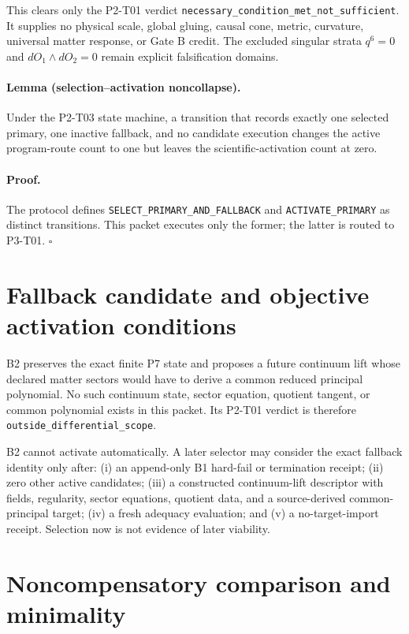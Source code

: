 \documentclass[11pt]{article}
\begin{document}
This clears only the P2-T01 verdict
\texttt{necessary\_condition\_met\_not\_sufficient}. It supplies no physical
scale, global gluing, causal cone, metric, curvature, universal matter response,
or Gate B credit. The excluded singular strata $q^6=0$ and
$dO_1\wedge dO_2=0$ remain explicit falsification domains.

\paragraph{Lemma (selection--activation noncollapse).}
Under the P2-T03 state machine, a transition that records exactly one selected
primary, one inactive fallback, and no candidate execution changes the active
program-route count to one but leaves the scientific-activation count at zero.

\paragraph{Proof.}
The protocol defines \texttt{SELECT\_PRIMARY\_AND\_FALLBACK} and
\texttt{ACTIVATE\_PRIMARY} as distinct transitions. This packet executes only
the former; the latter is routed to P3-T01. $\square$

\section{Fallback candidate and objective activation conditions}

B2 preserves the exact finite P7 state and proposes a future continuum lift
whose declared matter sectors would have to derive a common reduced principal
polynomial. No such continuum state, sector equation, quotient tangent, or
common polynomial exists in this packet. Its P2-T01 verdict is therefore
\texttt{outside\_differential\_scope}.

B2 cannot activate automatically. A later selector may consider the exact
fallback identity only after: (i) an append-only B1 hard-fail or termination
receipt; (ii) zero other active candidates; (iii) a constructed continuum-lift
descriptor with fields, regularity, sector equations, quotient data, and a
source-derived common-principal target; (iv) a fresh adequacy evaluation; and
(v) a no-target-import receipt. Selection now is not evidence of later
viability.

\section{Noncompensatory comparison and minimality}
\end{document}
